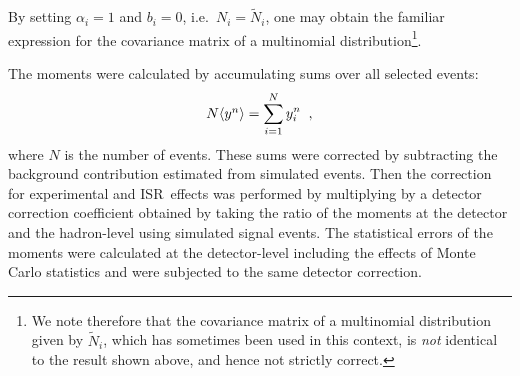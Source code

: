 \documentclass[12pt,a4paper,twoside]{article}
\newcommand{\momn}[2] {\mbox{\ensuremath{\langle#1^{#2}\rangle}}}
\newcommand{\dd}    {\ensuremath{\mathrm{d}}}
\newcommand{\isr}{\mbox{ISR}}
\begin{document}
By setting $\alpha_i=1$ and $b_i=0$, i.e.\ $N_i=\widetilde{N}_i$, 
one may obtain the familiar expression for the covariance matrix 
of a multinomial distribution\footnote{  We note therefore 
that the covariance matrix of a multinomial distribution given by
$\widetilde{N}_i$, which has sometimes been used in this context,
is {\em not} identical to the result shown above, 
and hence not strictly correct.}.


The moments were calculated by accumulating sums over all selected
events:
\begin{equation}
N\momn{y}{n} = \sum_{i=1}^{N} y_i^n \;\;,
\end{equation}
where $N$ is the number of events.
These sums were corrected by subtracting the background contribution 
estimated
from simulated events.  Then the correction for experimental and \isr\
effects was performed by multiplying by a detector correction
coefficient obtained by taking the ratio of the
moments at the detector and the
hadron-level using simulated signal events.  The statistical errors of
the moments were calculated at the detector-level including the effects
of Monte Carlo statistics and were subjected to the same detector
correction.
\end{document}
